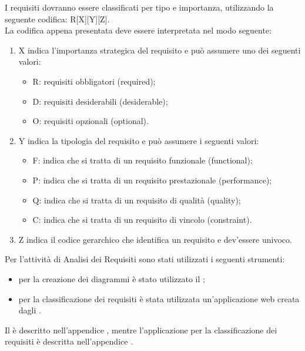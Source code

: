 					I requisiti dovranno essere classificati per tipo e importanza, utilizzando la seguente codifica: R[X][Y][Z].\\
					La codifica appena presentata deve essere interpretata nel modo seguente:
					\begin{enumerate}
						\item X indica l'importanza strategica del requisito e può assumere uno dei seguenti valori:
						\begin{itemize}
							\item R: requisiti obbligatori (required);
							\item D: requisiti desiderabili (desiderable);
							\item O: requisiti opzionali (optional).
						\end{itemize}
						\item Y indica la tipologia del requisito e può assumere i seguenti valori:
						\begin{itemize}
							\item F: indica che si tratta di un requisito funzionale (functional);
							\item P: indica che si tratta di un requisito prestazionale (performance);
							\item Q: indica che si tratta di un requisito di qualità (quality);
							\item C: indica che si tratta di un requisito di vincolo (constraint).
						\end{itemize}
						\item Z indica il codice gerarchico che identifica un requisito e dev'essere univoco.
					\end{enumerate}
			Per l'attività di Analisi dei Requisiti sono stati utilizzati i seguenti strumenti:
			\begin{itemize}
				\item per la creazione dei diagrammi  è stato utilizzato il  ;
				\item per la classificazione dei requisiti è stata utilizzata un'applicazione web creata dagli .
			\end{itemize}
			Il   è descritto nell'appendice , mentre l'applicazione per la classificazione dei requisiti è descritta nell'appendice .
			
